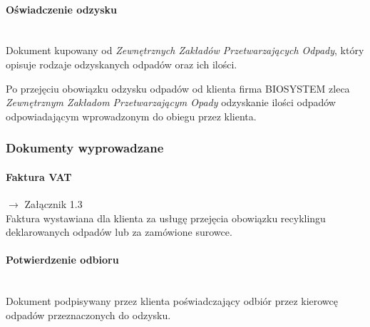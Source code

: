 	\paragraph{Oświadczenie odzysku} \ \\
	Dokument kupowany od \emph{Zewnętrznych Zakładów Przetwarzających Odpady}, który opisuje rodzaje odzyskanych odpadów oraz ich ilości.

	Po przejęciu obowiązku odzysku odpadów od klienta firma BIOSYSTEM zleca \emph{Zewnętrznym Zakładom Przetwarzającym Opady} odzyskanie ilości odpadów odpowiadającym wprowadzonym do obiegu przez klienta.

\subsubsection{Dokumenty wyprowadzane}
	\paragraph{Faktura VAT} $\rightarrow$ Załącznik 1.3 \\
	Faktura wystawiana dla klienta za usługę przejęcia obowiązku recyklingu deklarowanych odpadów lub za zamówione surowce.

	\paragraph{Potwierdzenie odbioru} \ \\
	Dokument podpisywany przez klienta poświadczający odbiór przez kierowcę odpadów przeznaczonych do odzysku.
